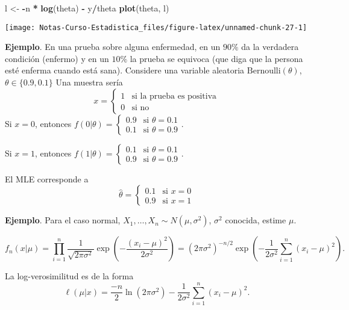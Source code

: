 \documentclass[
  12pt,
]{book}
\newenvironment{Shaded}{\begin{snugshade}}{\end{snugshade}}
\newcommand{\KeywordTok}[1]{\textcolor[rgb]{0.13,0.29,0.53}{\textbf{#1}}}
\newcommand{\NormalTok}[1]{#1}
\newcommand{\OperatorTok}[1]{\textcolor[rgb]{0.81,0.36,0.00}{\textbf{#1}}}
\newcommand{\StringTok}[1]{\textcolor[rgb]{0.31,0.60,0.02}{#1}}
\begin{document}
\begin{Shaded}
\begin{Highlighting}[]
\NormalTok{l \textless{}{-}}\StringTok{ }\OperatorTok{{-}}\NormalTok{n }\OperatorTok{*}\StringTok{ }\KeywordTok{log}\NormalTok{(theta) }\OperatorTok{{-}}\StringTok{ }\NormalTok{y}\OperatorTok{/}\NormalTok{theta}
\KeywordTok{plot}\NormalTok{(theta, l)}
\end{Highlighting}
\end{Shaded}

\begin{center}\texttt{[image: Notas-Curso-Estadistica\_files/figure-latex/unnamed-chunk-27-1]} \end{center}

\textbf{Ejemplo}. En una prueba sobre alguna enfermedad, en un \(90\%\) da la verdadera condición (enfermo) y en un \(10\%\) la prueba se equivoca (que diga que la persona esté enferma cuando está sana). Considere una variable aleatoria \(\text{Bernoulli}(\theta)\),\(\theta \in \{0.9,0.1\}\)
Una muestra sería
\[x = \begin{cases}1 & \text{si la prueba es positiva}\\0& \text{si no}\end{cases}\]
Si \(x=0\), entonces \(f(0|\theta) = \begin{cases}0.9 & \text{si }\theta = 0.1\\0.1& \text{si }\theta = 0.9\end{cases}\).

Si \(x=1\), entonces \(f(1|\theta) = \begin{cases}0.1 & \text{si }\theta = 0.1\\0.9& \text{si }\theta = 0.9\end{cases}\).

El MLE corresponde a
\[\hat\theta = \begin{cases}0.1 & \text{si }x= 0\\0.9& \text{si }x= 1\end{cases}\]

\textbf{Ejemplo}. Para el caso normal, \(X_1,\dots, X_n \sim N(\mu,\sigma^2)\), \(\sigma^2\) conocida, estime \(\mu\).

\[f_n(x|\mu) = \prod_{i=1}^n \dfrac{1}{\sqrt{2\pi\sigma^2}}\exp\left(-\dfrac{(x_i-\mu)^2}{2\sigma^2}\right) = (2\pi\sigma^2)^{-n/2}\exp\left(-\dfrac1{2\sigma^2}\sum_{i=1}^n(x_i-\mu)^2\right).\]

La log-verosimilitud es de la forma
\[ \ell(\mu|x) = \dfrac{-n}{2}\ln(2\pi\sigma^2)-\dfrac1{2\sigma^2}\sum_{i=1}^n(x_i-\mu)^2.\]
\end{document}
